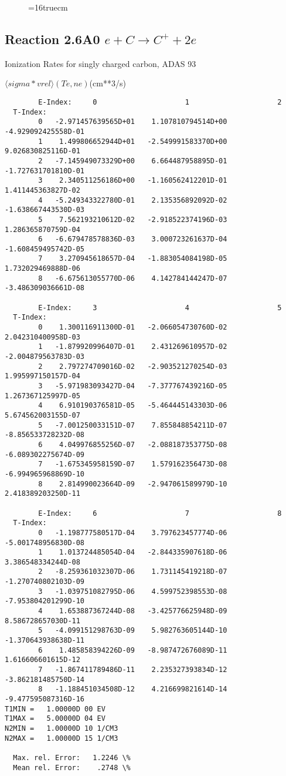 \documentclass[12pt,dvipdfmx]{article}
\begin{document}
\begin{figure} \label{2.2C}
\epsfxsize=16truecm
\end{figure}
\newpage


\subsection{
Reaction 2.6A0 $e + C \rightarrow C^+  + 2e $
}
  Ionization Rates for singly charged carbon,
  ADAS 93

$  \langle sigma*vrel \rangle(Te,ne) $(cm**3/s)
\begin{small}\begin{verbatim}
        E-Index:     0                     1                     2
  T-Index:
        0   -2.971457639565D+01    1.107810794514D+00   -4.929092425558D-01
        1    1.499806652944D+01   -2.549991583370D+00    9.026830825116D-01
        2   -7.145949073329D+00    6.664487958895D-01   -1.727631701810D-01
        3    2.340511256186D+00   -1.160562412201D-01    1.411445363827D-02
        4   -5.249343322780D-01    2.135356892092D-02   -1.638667443530D-03
        5    7.562193210612D-02   -2.918522374196D-03    1.286365870759D-04
        6   -6.679478578836D-03    3.000723261637D-04   -1.608459495742D-05
        7    3.270945618657D-04   -1.883054084198D-05    1.732029469888D-06
        8   -6.675613055770D-06    4.142784144247D-07   -3.486309036661D-08

        E-Index:     3                     4                     5
  T-Index:
        0    1.300116911300D-01   -2.066054730760D-02    2.042310400958D-03
        1   -1.879920996407D-01    2.431269610957D-02   -2.004879563783D-03
        2    2.797274709016D-02   -2.903521270254D-03    1.995997150157D-04
        3   -5.971983093427D-04   -7.377767439216D-05    1.267367125997D-05
        4    6.910190376581D-05   -5.464445143303D-06    5.674562003155D-07
        5   -7.001250033151D-07    7.855848854211D-07   -8.856533728232D-08
        6    4.049976855256D-07   -2.088187353775D-08   -6.089302275674D-09
        7   -1.675345958159D-07    1.579162356473D-08   -6.994965968869D-10
        8    2.814990023664D-09   -2.947061589979D-10    2.418389203250D-11

        E-Index:     6                     7                     8
  T-Index:
        0   -1.198777580517D-04    3.797623457774D-06   -5.001748956830D-08
        1    1.013724485054D-04   -2.844335907618D-06    3.386548334244D-08
        2   -8.259361032307D-06    1.731145419218D-07   -1.270740802103D-09
        3   -1.039751082795D-06    4.599752398553D-08   -7.953804201299D-10
        4    1.653887367244D-08   -3.425776625948D-09    8.586728657030D-11
        5   -4.099151298763D-09    5.982763605144D-10   -1.370643938638D-11
        6    1.485858394226D-09   -8.987472676089D-11    1.616606601615D-12
        7   -1.867411789486D-11    2.235327393834D-12   -3.862181485750D-14
        8   -1.188451034508D-12    4.216699821614D-14   -9.477595087316D-16
T1MIN =   1.00000D 00 EV
T1MAX =   5.00000D 04 EV
N2MIN =   1.00000D 10 1/CM3
N2MAX =   1.00000D 15 1/CM3

  Max. rel. Error:   1.2246 \%
  Mean rel. Error:    .2748 \%
\end{verbatim}\end{small}
\end{document}
